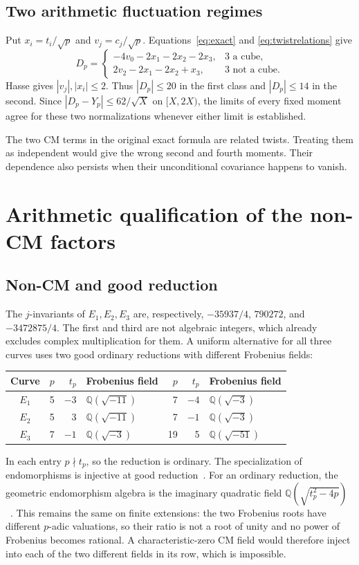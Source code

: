\documentclass[11pt]{article}
\theoremstyle{definition}\newtheorem{definition}[theorem]{Definition}
\newcommand{\Q}{\mathbb Q}
\begin{document}
\subsection{Two arithmetic fluctuation regimes}
Put $x_i=t_i/\sqrt p$ and $v_j=c_j/\sqrt p$.
Equations~\eqref{eq:exact} and \eqref{eq:twistrelations} give
\begin{equation}\label{eq:conditional}
 D_p=
 \begin{cases}
 -4v_0-2x_1-2x_2-2x_3,&3\text{ a cube},\\
  2v_2-2x_1-2x_2+x_3,&3\text{ not a cube}.
 \end{cases}
\end{equation}
Hasse gives $|v_j|,|x_i|\le2$. Thus $|D_p|\le20$
in the first class and $|D_p|\le14$ in the second.
Since $|D_p-Y_p|\le62/\sqrt X$ on $[X,2X)$,
the limits of every fixed moment agree for these two
normalizations whenever either limit is established.

The two CM terms in the original exact formula are related
twists. Treating them as independent would give the wrong
second and fourth moments. Their dependence also persists
when their unconditional covariance happens to vanish.

\section{Arithmetic qualification of the non-CM factors}\label{sec:qualification}
\subsection{Non-CM and good reduction}
The $j$-invariants of $E_1,E_2,E_3$ are, respectively,
$-35937/4$, $790272$, and $-3472875/4$.
The first and third are not algebraic integers, which
already excludes complex multiplication for them.
A uniform alternative for all three curves uses two
good ordinary reductions with different Frobenius fields:
\begin{center}
\begin{tabular}{c rr l rr l}
\toprule
Curve&$p$&$t_p$&Frobenius field&$p$&$t_p$&Frobenius field\\
\midrule
$E_1$&5&$-3$&$\Q(\sqrt{-11})$&7&$-4$&$\Q(\sqrt{-3})$\\
$E_2$&5&3&$\Q(\sqrt{-11})$&7&$-1$&$\Q(\sqrt{-3})$\\
$E_3$&7&$-1$&$\Q(\sqrt{-3})$&19&5&$\Q(\sqrt{-51})$\\
\bottomrule
\end{tabular}
\end{center}
In each entry $p\nmid t_p$, so the reduction is ordinary.
The specialization of endomorphisms is injective at good
reduction~\cite{sutherland21}. For an ordinary reduction,
the geometric endomorphism algebra is the imaginary
quadratic field $\Q(\sqrt{t_p^2-4p})$~\cite{sutherland13}.
This remains the same on finite extensions: the two
Frobenius roots have different $p$-adic valuations, so their
ratio is not a root of unity and no power of Frobenius
becomes rational. A characteristic-zero CM field would
therefore inject into each of the two different fields
in its row, which is impossible.
\end{document}
